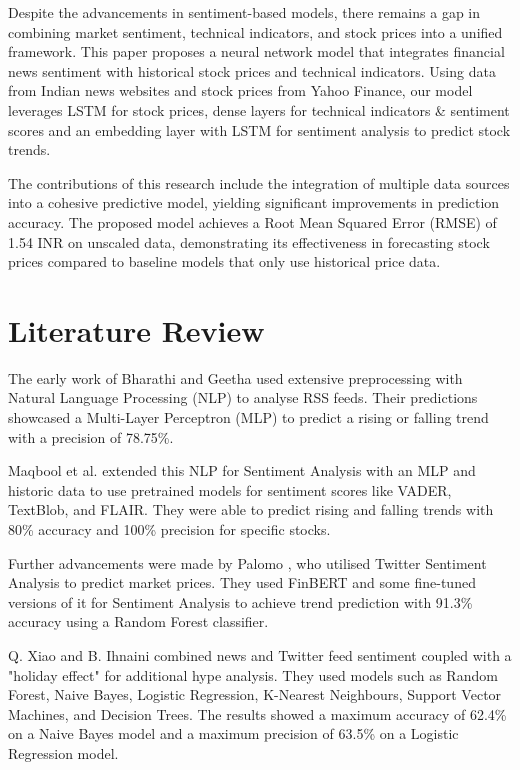 \documentclass[conference]{IEEEtran}
\begin{document}
Despite the advancements in sentiment-based models, there remains a gap in combining market sentiment, technical indicators, and stock prices into a unified framework. This paper proposes a neural network model that integrates financial news sentiment with historical stock prices and technical indicators. Using data from Indian news websites and stock prices from Yahoo Finance, our model leverages LSTM for stock prices, dense layers for technical indicators \& sentiment scores and an embedding layer with LSTM for sentiment analysis to predict stock trends.

The contributions of this research include the integration of multiple data sources into a cohesive predictive model, yielding significant improvements in prediction accuracy. The proposed model achieves a Root Mean Squared Error (RMSE) of 1.54 INR on unscaled data, demonstrating its effectiveness in forecasting stock prices compared to baseline models that only use historical price data.

\section{Literature Review}
The early work of Bharathi and Geetha \cite{bharathi2017} used extensive preprocessing with Natural Language Processing (NLP) to analyse RSS feeds. Their predictions showcased a Multi-Layer Perceptron (MLP) to predict a rising or falling trend with a precision of 78.75\%.

Maqbool et al. \cite{maqbool2023} extended this NLP for Sentiment Analysis with an MLP and historic data to use pretrained models for sentiment scores like VADER, TextBlob, and FLAIR. They were able to predict rising and falling trends with 80\% accuracy and 100\% precision for specific stocks.

Further advancements were made by Palomo \cite{palomo}, who utilised Twitter Sentiment Analysis to predict market prices. They used FinBERT and some fine-tuned versions of it for Sentiment Analysis to achieve trend prediction with 91.3\% accuracy using a Random Forest classifier.

Q. Xiao and B. Ihnaini \cite{xiao2023} combined news and Twitter feed sentiment coupled with a "holiday effect" for additional hype analysis. They used models such as Random Forest, Naive Bayes, Logistic Regression, K-Nearest Neighbours, Support Vector Machines, and Decision Trees. The results showed a maximum accuracy of 62.4\% on a Naive Bayes model and a maximum precision of 63.5\% on a Logistic Regression model.
\end{document}
